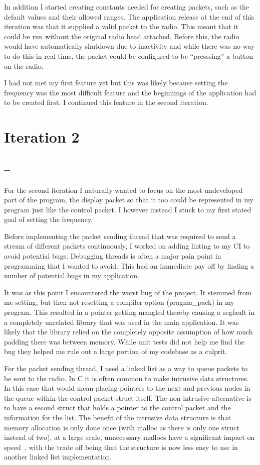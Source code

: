 In addition I started creating constants needed for creating packets, such as the default values and their allowed ranges. The application release at the end of this iteration was that it supplied a valid packet to the radio. This meant that it could be run without the original radio head attached. Before this, the radio would have automatically shutdown due to inactivity and while there was no way to do this in real-time, the packet could be configured to be ``presssing'' a button on the radio.

I had not met my first feature yet but this was likely because setting the frequency was the most difficult feature and the beginnings of the application had to be created first. I continued this feature in the second iteration.

\section{Iteration 2}
\subsection*{ -- }

For the second iteration I naturally wanted to focus on the most undeveloped part of the program, the display packet so that it too could be represented in my program just like the control packet. I however instead I stuck to my first stated goal of setting the frequency.

Before implementing the packet sending thread that was required to send a stream  of different packets continuously, I worked on adding linting to my CI to avoid potential bugs. Debugging threads is often a major pain point in programming that I wanted to avoid. This had an immediate pay off by finding a number of potential bugs in my application.

It was as this point I encountered the worst bug of the project. It stemmed from me setting, but then not resetting a compiler option (pragma\_pack) in my program. This resulted in a pointer getting mangled thereby causing a segfault in a completely unrelated library that was used in the main application. It was likely that the library relied on the completely opposite assumption of how much padding there was between memory. While unit tests did not help me find the bug they helped me rule out a large portion of my codebase as a culprit. 

For the packet sending thread, I used a linked list as a way to queue packets to be sent to the radio. In C it is often common to make intrusive data structures. In this case that would mean placing pointers to the next and previous nodes in the queue within the control packet struct itself. The non-intrusive alternative is to have a second struct that holds a pointer to the control packet and the information for the list. The benefit of the intrusive data structure is that memory allocation is only done once (with malloc as there is only one struct instead of two), at a large scale, unnecessary mallocs have a significant impact on speed~\cite{curl_mallocs}, with the trade off being that the structure is now less easy to use in another linked list implementation. 

